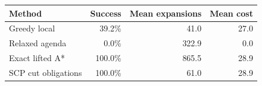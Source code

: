 \begin{tabular}{lrrr}
\toprule
Method & Success & Mean expansions & Mean cost \\
\midrule
Greedy local & 39.2\% & 41.0 & 27.0 \\
Relaxed agenda & 0.0\% & 322.9 & 0.0 \\
Exact lifted A* & 100.0\% & 865.5 & 28.9 \\
SCP cut obligations & 100.0\% & 61.0 & 28.9 \\
\bottomrule
\end{tabular}